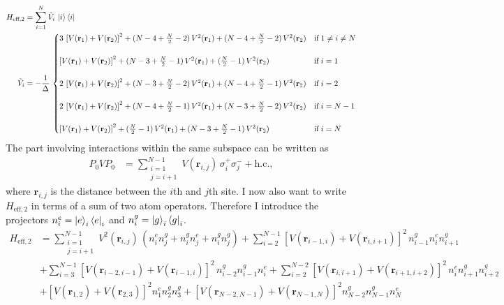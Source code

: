 \begin{align*}
    H_{\text{eff},2}&= \sum_{i=1}^N\tilde{V}_i\,\ket{i}\bra{i}\\
    \tilde{V}_i &=-\frac{1}{\Delta}\,\begin{cases}
        3\,\left[V(\mathbf{r}_1)+V(\mathbf{r}_2)\right]^2+(N-4+\frac{N}{2}-2)\,V^2(\mathbf{r}_1)+(N-4+\frac{N}{2}-2)\,V^2(\mathbf{r}_2)&\text{if}\;1\neq i\neq N\\\\
        \left[V(\mathbf{r}_1)+V(\mathbf{r}_2)\right]^2+(N-3+\frac{N}{2}-1)\,V^2(\mathbf{r}_1)+(\frac{N}{2}-1)\,V^2(\mathbf{r}_2)&\text{if}\;i=1\\\\
        2\,\left[V(\mathbf{r}_1)+V(\mathbf{r}_2)\right]^2+(N-3+\frac{N}{2}-2)\,V^2(\mathbf{r}_1)+(N-4+\frac{N}{2}-1)\,V^2(\mathbf{r}_2)&\text{if}\;i=2\\\\
        2\,\left[V(\mathbf{r}_1)+V(\mathbf{r}_2)\right]^2+(N-4+\frac{N}{2}-1)\,V^2(\mathbf{r}_1)+(N-3+\frac{N}{2}-2)\,V^2(\mathbf{r}_2)&\text{if}\;i=N-1\\\\
        \left[V(\mathbf{r}_1)+V(\mathbf{r}_2)\right]^2+(\frac{N}{2}-1)\,V^2(\mathbf{r}_1)+(N-3+\frac{N}{2}-1)\,V^2(\mathbf{r}_2)&\text{if}\;i=N
    \end{cases}
\end{align*}
The part involving interactions within the same subspace can be written as 
\begin{align*}
    P_0VP_0&= \sum_{\substack{i=1\\j=i+1}}^{N-1} V(\mathbf{r}_{i,j})\,\sigma^+_i\sigma^-_j+\text{h.c.},
\end{align*}
where $\mathbf{r}_{i,j}$ is the distance between the $i$th and $j$th site. I now also want to write $H_{\text{eff},2}$ in terms of a sum of two atom operators. Therefore I introduce the projectors $n^e_i=\ket{e}_i\bra{e}_i$ and $n^g_i=\ket{g}_i\bra{g}_i$.
\begin{align*}
    H_{\text{eff},2}&=\sum_{\substack{i=1\\j=i+1}}^{N-1}V^2(\mathbf{r}_{i,j})\,(n^e_in^g_j + n^g_in^e_j + n^g_in^g_j)+\sum_{i=2}^{N-1}\left[ V(\mathbf{r}_{i-1,i})+V(\mathbf{r}_{i,i+1}) \right]^2 \, n^g_{i-1}n^e_in^g_{i+1}\\ &+\sum_{i=3}^{N-1} \left[ V(\mathbf{r}_{i-2,i-1})+V(\mathbf{r}_{i-1,i}) \right]^2 \, n^g_{i-2}n^g_{i-1}n^e_{i} 
    +\sum_{i=2}^{N-2} \left[ V(\mathbf{r}_{i,i+1})+V(\mathbf{r}_{i+1,i+2}) \right]^2 \, n^e_{i}n^g_{i+1}n^g_{i+2} \\
    &+ \left[ V(\mathbf{r}_{1,2})+V(\mathbf{r}_{2,3}) \right]^2 n^e_1n^g_2n^g_3 + \left[ V(\mathbf{r}_{N-2,N-1})+V(\mathbf{r}_{N-1,N}) \right]^2 n^g_{N-2}n^g_{N-1}n^e_{N}
\end{align*}
